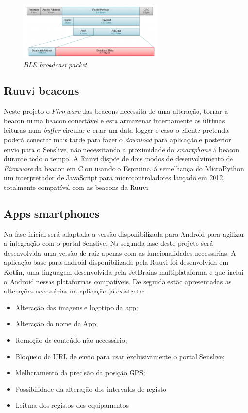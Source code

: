 \begin{figure}[htb]
\centering
\includegraphics[width=0.65\textwidth]{images/blepacket.png}
\caption{\textit{BLE broadcast packet}\cite{blepacket}}\label{blepacket}
\end{figure}


\subsection{Ruuvi beacons}
\par Neste projeto o \textit{Firmware} das beacons necessita de uma alteração, tornar a beacon numa beacon conectável e esta armazenar internamente as últimas leituras num \textit{buffer} circular e criar um data-logger e caso o cliente pretenda poderá conectar mais tarde para fazer o \textit{download} para aplicação e posterior envio para o Senslive, não necessitando a proximidade do \textit{smartphone} á beacon durante todo o tempo. A Ruuvi dispõe de dois modos de desenvolvimento de \textit{Firmware} da beacon em C ou usando o Espruino, á semelhança do MicroPython um interpretador de JavaScript para microcontroladores lançado em 2012, totalmente compatível com as beacons da Ruuvi.

\subsection{Apps smartphones}
Na fase inicial será adaptada a versão disponibilizada para Android para agilizar a integração com o portal Senslive. Na segunda fase deste projeto será desenvolvida uma versão de raiz apenas com as funcionalidades necessárias. A aplicação base para android disponibilizada pela Ruuvi foi desenvolvida em Kotlin\cite{ruuviappgithub}, uma linguagem desenvolvida pela JetBrains multiplataforma e que inclui o Android nessas plataformas compatíveis.
De seguida estão apresentadas as alterações necessárias na aplicação já existente:
\begin{itemize}
\item Alteração das imagens e logotipo da app;
\item Alteração do nome da App;
\item Remoção de conteúdo não necessário;
\item Bloqueio do URL de envio para usar exclusivamente o portal Senslive;
\item Melhoramento da precisão da posição GPS;
\item Possibilidade da alteração dos intervalos de registo
\item Leitura dos registos dos equipamentos
\end{itemize}



